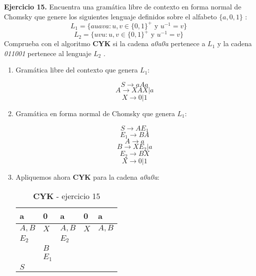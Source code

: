 \documentclass[11pt,a4paper]{article}
\begin{document}
\textbf{Ejercicio 15.} Encuentra una gramática libre de contexto en forma normal de Chomsky que genere los
siguientes lenguaje definidos sobre el alfabeto $\{a, 0, 1\}$ :
$$L_1 = \{auava : u,v \in \{0, 1\}^+ \text { y } u^{-1} = v\} $$
$$L_2 = \{uvu : u,v \in \{0, 1\}^+ \text{ y } u^{-1} = v\} $$
Comprueba con el algoritmo \textbf{CYK} si la cadena \emph{a0a0a} pertenece a $L_1$ y la cadena \emph{011001} pertenece al lenguaje $L_2$ . \\

\begin{enumerate}
	\item Gramática libre del contexto que genera $L_1$:
		
	$$ S \rightarrow aAa $$
	$$ A \rightarrow XAX | a $$
	$$ X \rightarrow 0|1 $$
		
	\item Gramática en forma normal de Chomsky que genera $L_1$:
	
	$$ S \rightarrow AE_1 $$
	$$ E_1 \rightarrow BA $$
	$$ A \rightarrow a $$
	$$ B \rightarrow XE_2 | a $$
	$$ E_2 \rightarrow BX $$
	$$ X \rightarrow 0|1 $$
	
	\item Apliquemos ahora \textbf{CYK} para la cadena \emph{a0a0a}:
	
	\begin{table}[h]
		\centering
		\caption{\textbf{CYK} - ejercicio 15}
		\label{my-label}
		\begin{tabular}{lllll}
			a                            & 0                          & a                           & 0                        & a                           \\ \hline
			\multicolumn{1}{|l|}{$A, B$} & \multicolumn{1}{l|}{$X$}   & \multicolumn{1}{l|}{$A, B$} & \multicolumn{1}{l|}{$X$} & \multicolumn{1}{l|}{$A, B$} \\ \hline
			\multicolumn{1}{|l|}{$E_2$}  & \multicolumn{1}{l|}{}      & \multicolumn{1}{l|}{$E_2$}  & \multicolumn{1}{l|}{}    &                             \\ \cline{1-4}
			\multicolumn{1}{|l|}{}       & \multicolumn{1}{l|}{$B$}   & \multicolumn{1}{l|}{}       &                          &                             \\ \cline{1-3}
			\multicolumn{1}{|l|}{}       & \multicolumn{1}{l|}{$E_1$} &                             &                          &                             \\ \cline{1-2}
			\multicolumn{1}{|l|}{$S$}    &                            &                             &                          &                             \\ \cline{1-1}
		\end{tabular}
	\end{table}
	

\end{enumerate}
\end{document}
